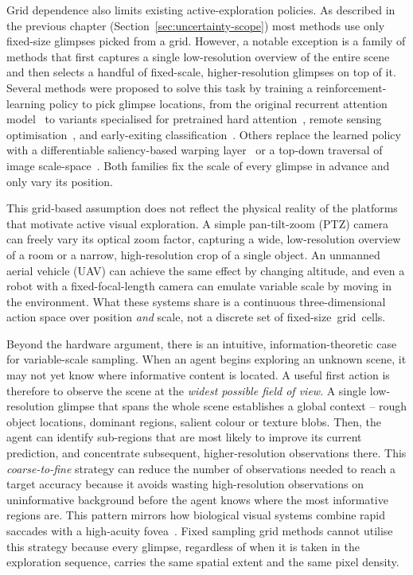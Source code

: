 Grid dependence also limits existing active-exploration policies. As described in the previous chapter (Section~\ref{sec:uncertainty-scope}) most methods use only fixed-size glimpses picked from a grid. However, a notable exception is a family of methods that first captures a single low-resolution overview of the entire scene and then selects a handful of fixed-scale, higher-resolution glimpses on top of it. Several methods were proposed to solve this task by training a reinforcement-learning policy to pick glimpse locations, from the original recurrent attention model~\cite{ba2015multiple} to variants specialised for pretrained hard attention~\cite{elsayed2019saccader}, remote sensing optimisation~\cite{uzkent2020learning}, and early-exiting classification~\cite{wang2020glance}. Others replace the learned policy with a differentiable saliency-based warping layer~\cite{recasens2018learning} or a top-down traversal of image scale-space~\cite{papadopoulos2021hard}. Both families fix the scale of every glimpse in advance and only vary its position.

This grid-based assumption does not reflect the physical reality of the platforms that motivate active visual exploration. A simple pan-tilt-zoom (PTZ) camera can freely vary its optical zoom factor, capturing a wide, low-resolution overview of a room or a narrow, high-resolution crop of a single object. An unmanned aerial vehicle (UAV) can achieve the same effect by changing altitude, and even a robot with a fixed-focal-length camera can emulate variable scale by moving in the environment. What these systems share is a continuous three-dimensional action space over position \emph{and} scale, not a discrete set of fixed-size~grid~cells.

Beyond the hardware argument, there is an intuitive, information-theoretic case for variable-scale sampling. When an agent begins exploring an unknown scene, it may not yet know where informative content is located. A useful first action is therefore to observe the scene at the \emph{widest possible field of view}. A single low-resolution glimpse that spans the whole scene establishes a global context -- rough object locations, dominant regions, salient colour or texture blobs. Then, the agent can identify sub-regions that are most likely to improve its current prediction, and concentrate subsequent, higher-resolution observations there. This \emph{coarse-to-fine} strategy can reduce the number of observations needed to reach a target accuracy because it avoids wasting high-resolution observations on uninformative background before the agent knows where the most informative regions are. This pattern mirrors how biological visual systems combine rapid saccades with a high-acuity fovea~\cite{yarbus1967eye,curcio1990human}. Fixed sampling grid methods cannot utilise this strategy because every glimpse, regardless of when it is taken in the exploration sequence, carries the same spatial extent and the same pixel density.

